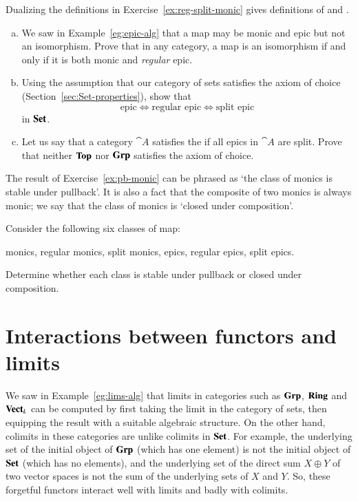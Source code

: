 \begin{question}
Dualizing the definitions in Exercise~\ref{ex:reg-split-monic} gives
definitions of %
%
%
and .
% 
\begin{enumerate}[(b)]
\item 
We saw in Example~\ref{eg:epic-alg} that a map may be monic and epic but
not an isomorphism.  Prove that in any category, a map is an isomorphism if
and only if it is both monic and \emph{regular} epic.

\item 
Using the assumption that our category of sets satisfies the axiom of
choice (Section~\ref{sec:Set-properties}), show that
\[
\text{epic} \iff \text{regular epic} \iff \text{split epic}
\]
in $\mathbf{Set}$.

\item 
Let us say that a category $\cat{A}$ satisfies the  if all epics in $\cat{A}$ are split.  Prove that neither $\mathbf{Top}$
nor $\mathbf{Grp}$ satisfies the axiom of choice.
\end{enumerate}
\end{question}


\begin{question}
The result of Exercise~\ref{ex:pb-monic} can be phrased as `the class of
monics%
%
%
%
is stable under pullback'.  It is also a fact that the composite%
%
%
of two monics is always monic; we say that the class of monics is `closed
under composition'.

Consider the following six classes of map:
% 
\begin{displaytext}
monics, regular monics, split monics,
epics, regular epics, split epics.
\end{displaytext}
% 
Determine whether each class is stable under pullback or closed under
composition.
\end{question}



\section{Interactions between functors and limits}
\label{sec:lims-ftrs}


We saw in Example~\ref{eg:lims-alg} that limits in categories such as
$\mathbf{Grp}$, $\mathbf{Ring}$ and $\mathbf{Vect}_k$ can be computed by first taking the limit in
the category of sets, then equipping the result with a suitable algebraic
structure.  On the other hand, colimits in these categories are unlike
colimits in $\mathbf{Set}$.  For example, the underlying set of the initial object
of $\mathbf{Grp}$ (which has one element) is not the initial object of $\mathbf{Set}$
(which has no elements), and the underlying set of the direct sum $X \oplus
Y$ of two vector spaces is not the sum of the underlying sets of $X$ and
$Y$.  So, these forgetful functors interact well with limits and badly with
colimits.

